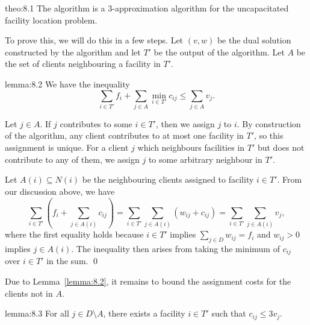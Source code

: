 \begin{theo}{theo:8.1}
    The algorithm is a $3$-approximation algorithm for the 
    uncapacitated facility location problem.
\end{theo}\vspace{-0.25cm}

To prove this, we will do this in a few steps. Let $(v, w)$ be the dual 
solution constructed by the algorithm and let $T'$ be the output of the algorithm.
Let $A$ be the set of clients neighbouring a facility in $T'$.

\begin{lemma}{lemma:8.2}
    We have the inequality 
    \[ \sum_{i\in T'} f_i + \sum_{j\in A} \min_{i\in T'} c_{ij} \leq \sum_{j\in A} v_j. \] 
\end{lemma}\vspace{-0.25cm}
\begin{pf}
    Let $j \in A$. If $j$ contributes to some $i \in T'$, then we assign $j$ 
    to $i$. By construction of the algorithm, any client contributes to 
    at most one facility in $T'$, so this assignment is unique. 
    For a client $j$ which neighbours facilities in $T'$ but does not contribute to 
    any of them, we assign $j$ to some arbitrary neighbour in $T'$.
    
    Let $A(i) \subseteq N(i)$ be the neighbouring clients assigned to facility 
    $i \in T'$. From our discussion above, we have
    \[ \sum_{i\in T'} \left( f_i + \sum_{j\in A(i)} c_{ij} \right) 
    = \sum_{i\in T'} \sum_{j\in A(i)} (w_{ij} + c_{ij}) 
    = \sum_{i\in T'} \sum_{j\in A(i)} v_j, \] 
    where the first equality holds because $i \in T'$ implies 
    $\sum_{j\in D} w_{ij} = f_i$ and $w_{ij} > 0$ implies $j \in A(i)$. 
    The inequality then arises from taking the minimum of $c_{ij}$ over $i \in T'$
     in the sum. \qed 
\end{pf}\vspace{-0.25cm}

Due to Lemma~\ref{lemma:8.2}, it remains to bound the assignment costs 
for the clients not in $A$.

\begin{lemma}{lemma:8.3}
    For all $j \in D \setminus A$, there exists a facility $i \in T'$ 
    such that $c_{ij} \leq 3v_j$. 
\end{lemma}\vspace{-0.25cm}

